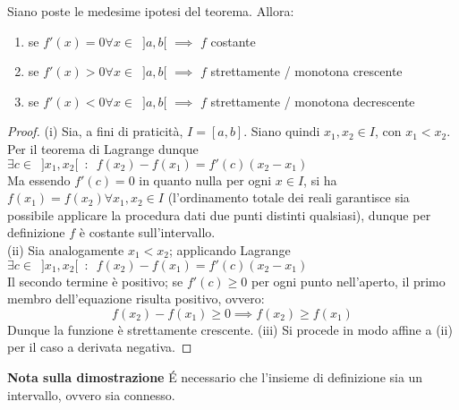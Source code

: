\documentclass[10pt, oneside]{book}
\theoremstyle{plain}
\begin{document}
\begin{cor}
\label{corlagrange}
Siano poste le medesime ipotesi del teorema. Allora:
\begin{enumerate}[label=$\square$]
    \item se $f'(x) = 0 \forall x \in \enspace ]a, b[$ $\implies$ $f$ costante
    \item se $f'(x) > 0 \forall x \in \enspace ]a, b[$ $\implies$ $f$ strettamente / monotona crescente
    \item se $f'(x) < 0 \forall x \in \enspace ]a, b[$ $\implies$ $f$ strettamente / monotona decrescente
\end{enumerate}
\end{cor}
\begin{proof}
(i) Sia, a fini di praticità, $I = [a, b]$. Siano quindi $x_1, x_2 \in I$, con $x_1 < x_2$. Per il teorema di Lagrange dunque $\exists c \in \enspace ]x_1, x_2[ \enspace : \enspace f(x_2) - f(x_1) = f'(c)(x_2 - x_1)$\\
Ma essendo $f'(c) = 0$ in quanto nulla per ogni $x \in I$, si ha $f(x_1) = f(x_2) \forall x_1, x_2 \in I$ (l'ordinamento totale dei reali garantisce sia possibile applicare la procedura dati due punti distinti qualsiasi), dunque per definizione $f$ è costante sull'intervallo.\\
(ii) Sia analogamente $x_1 < x_2$; applicando Lagrange $\exists c \in \enspace ]x_1, x_2[ \enspace : \enspace f(x_2) - f(x_1) = f'(c)(x_2 - x_1)$\\
Il secondo termine è positivo; se $f'(c) \geq 0$ per ogni punto nell'aperto, il primo membro dell'equazione risulta positivo, ovvero:
\[f(x_2) - f(x_1) \geq 0 \implies f(x_2) \geq f(x_1)\]
Dunque la funzione è strettamente crescente.
(iii) Si procede in modo affine a (ii) per il caso a derivata negativa.
\end{proof}
\textbf{Nota sulla dimostrazione} \'E necessario che l'insieme di definizione sia un intervallo, ovvero sia connesso.
\end{document}
